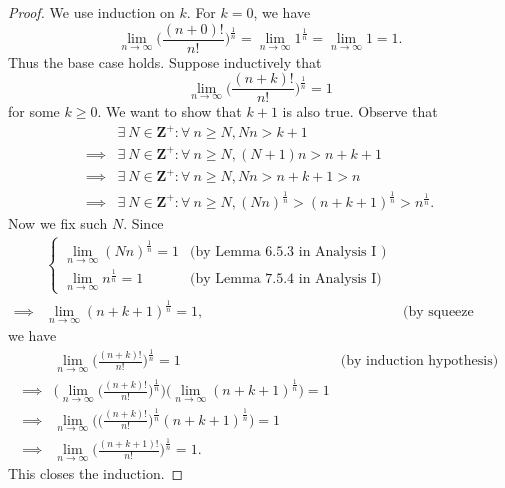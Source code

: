 \begin{proof}
    We use induction on \(k\).
    For \(k = 0\), we have
    \[
        \lim_{n \to \infty} \bigg(\frac{(n + 0)!}{n!}\bigg)^{\frac{1}{n}} = \lim_{n \to \infty} 1^{\frac{1}{n}} = \lim_{n \to \infty} 1 = 1.
    \]
    Thus the base case holds.
    Suppose inductively that
    \[
        \lim_{n \to \infty} \bigg(\frac{(n + k)!}{n!}\bigg)^{\frac{1}{n}} = 1
    \]
    for some \(k \geq 0\).
    We want to show that \(k + 1\) is also true.
    Observe that
    \begin{align*}
                 & \exists\ N \in \mathbf{Z}^+ : \forall\ n \geq N, Nn > k + 1                                                        \\
        \implies & \exists\ N \in \mathbf{Z}^+ : \forall\ n \geq N, (N + 1)n > n + k + 1                                              \\
        \implies & \exists\ N \in \mathbf{Z}^+ : \forall\ n \geq N, Nn > n + k + 1 > n                                                \\
        \implies & \exists\ N \in \mathbf{Z}^+ : \forall\ n \geq N, (Nn)^{\frac{1}{n}} > (n + k + 1)^{\frac{1}{n}} > n^{\frac{1}{n}}.
    \end{align*}
    Now we fix such \(N\).
    Since
    \begin{align*}
                 & \begin{cases}
            \lim_{n \to \infty} (Nn)^{\frac{1}{n}} = 1 & \text{(by Lemma 6.5.3 in Analysis I )} \\
            \lim_{n \to \infty} n^{\frac{1}{n}} = 1    & \text{(by Lemma 7.5.4 in Analysis I)}
        \end{cases}                                                     \\
        \implies & \lim_{n \to \infty} (n + k + 1)^{\frac{1}{n}} = 1, & \text{(by squeeze test)}
    \end{align*}
    we have
    \begin{align*}
                 & \lim_{n \to \infty} \bigg(\frac{(n + k)!}{n!}\bigg)^{\frac{1}{n}} = 1                                                                       & \text{(by induction hypothesis)} \\
        \implies & \Bigg(\lim_{n \to \infty} \bigg(\frac{(n + k)!}{n!}\bigg)^{\frac{1}{n}}\Bigg) \bigg(\lim_{n \to \infty} (n + k + 1)^{\frac{1}{n}}\bigg) = 1                                    \\
        \implies & \lim_{n \to \infty} \Bigg(\bigg(\frac{(n + k)!}{n!}\bigg)^{\frac{1}{n}} (n + k + 1)^{\frac{1}{n}}\Bigg) = 1                                                                    \\
        \implies & \lim_{n \to \infty} \bigg(\frac{(n + k + 1)!}{n!}\bigg)^{\frac{1}{n}} = 1.
    \end{align*}
    This closes the induction.
\end{proof}

